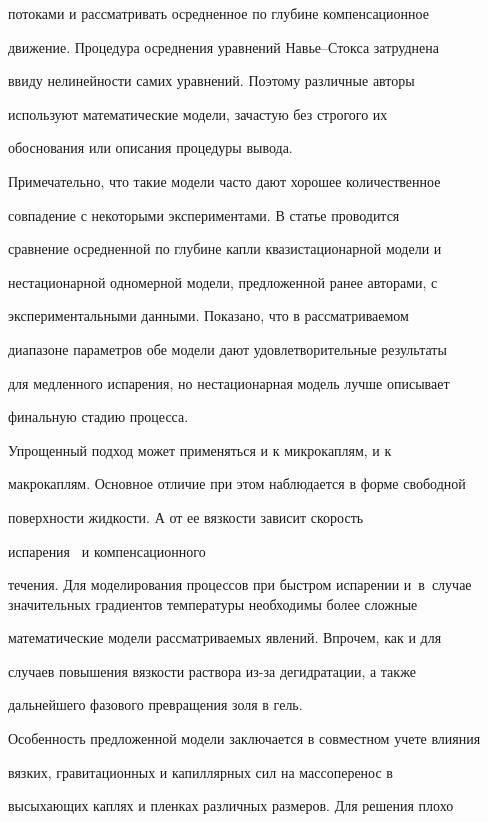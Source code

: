 потоками и рассматривать осредненное по глубине компенсационное

движение. Процедура осреднения уравнений Навье--Стокса затруднена

ввиду нелинейности самих уравнений. Поэтому различные авторы

используют математические модели, зачастую без строгого их

обоснования или описания процедуры вывода.



Примечательно, что такие модели часто дают хорошее количественное

совпадение с некоторыми экспериментами. В статье проводится

сравнение осредненной по глубине капли квазистационарной модели и

нестационарной одномерной модели, предложенной ранее авторами, с

экспериментальными данными. Показано, что в рассматриваемом

диапазоне параметров обе модели дают удовлетворительные результаты

для медленного испарения, но нестационарная модель лучше описывает

финальную стадию процесса.



Упрощенный подход может применяться и к микрокаплям, и к

макрокаплям. Основное отличие при этом наблюдается в форме свободной

поверхности жидкости. А от ее вязкости зависит скорость

испарения~\cite{Rieger,PhysRevE.83.051602} и компенсационного

течения. Для моделирования процессов при быстром испарении и~в~случае значительных градиентов температуры необходимы более сложные

математические модели рассматриваемых явлений. Впрочем, как и для

случаев повышения вязкости раствора из-за дегидратации, а также

дальнейшего фазового превращения золя в гель.



Особенность предложенной модели заключается в совместном учете влияния

вязких, гравитационных и капиллярных сил на массоперенос в

высыхающих каплях и пленках различных размеров. Для решения плохо

